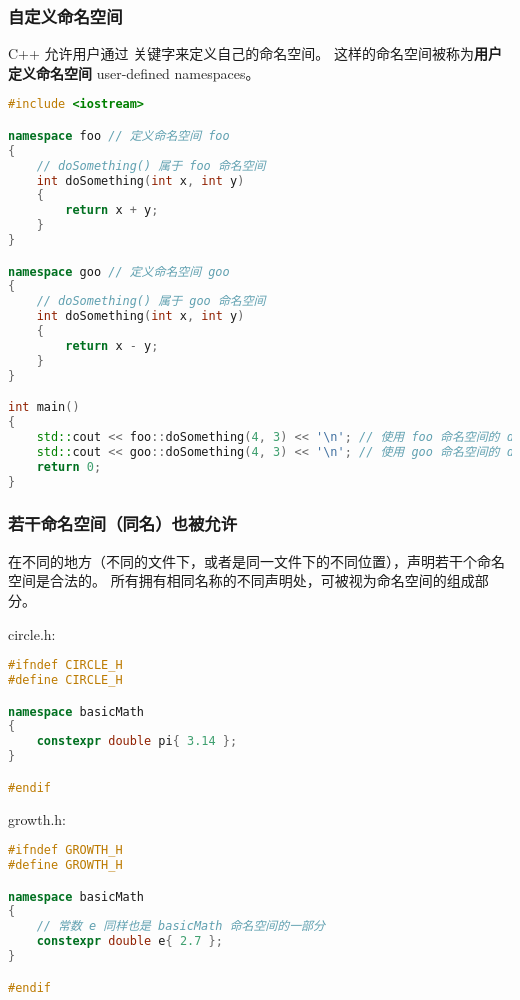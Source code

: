 \documentclass[../../LearnCpp.tex]{subfiles}
\begin{document}

\subsubsection*{自定义命名空间}

C++ 允许用户通过  关键字来定义自己的命名空间。
这样的命名空间被称为\textbf{用户定义命名空间} user-defined namespaces。

\begin{lstlisting}[language=C++]
#include <iostream>

namespace foo // 定义命名空间 foo
{
    // doSomething() 属于 foo 命名空间
    int doSomething(int x, int y)
    {
        return x + y;
    }
}

namespace goo // 定义命名空间 goo
{
    // doSomething() 属于 goo 命名空间
    int doSomething(int x, int y)
    {
        return x - y;
    }
}

int main()
{
    std::cout << foo::doSomething(4, 3) << '\n'; // 使用 foo 命名空间的 doSomething()
    std::cout << goo::doSomething(4, 3) << '\n'; // 使用 goo 命名空间的 doSomething()
    return 0;
}
\end{lstlisting}

\subsubsection*{若干命名空间（同名）也被允许}

在不同的地方（不同的文件下，或者是同一文件下的不同位置），声明若干个命名空间是合法的。
所有拥有相同名称的不同声明处，可被视为命名空间的组成部分。

circle.h:

\begin{lstlisting}[language=C++]
#ifndef CIRCLE_H
#define CIRCLE_H

namespace basicMath
{
    constexpr double pi{ 3.14 };
}

#endif
\end{lstlisting}

growth.h:

\begin{lstlisting}[language=C++]
#ifndef GROWTH_H
#define GROWTH_H

namespace basicMath
{
    // 常数 e 同样也是 basicMath 命名空间的一部分
    constexpr double e{ 2.7 };
}

#endif
\end{lstlisting}
\end{document}
